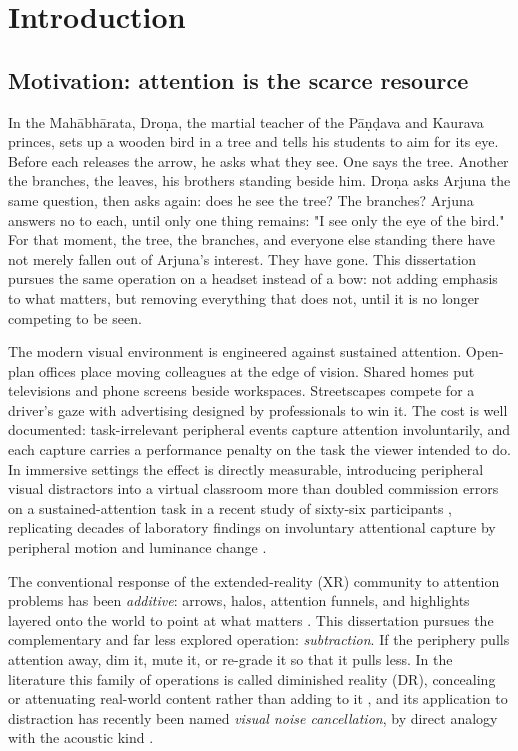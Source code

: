 \chapter{Introduction}

\section{Motivation: attention is the scarce resource}
In the Mah\=abh\=arata, Dro\d{n}a, the martial teacher of the P\=a\d{n}\d{d}ava and Kaurava princes, sets up a wooden 
bird in a tree and tells his students to aim for its eye. Before each releases the arrow, he asks what 
they see. One says the tree. Another the branches, the leaves, his brothers standing beside him. 
Dro\d{n}a asks Arjuna the same question, then asks again: does he see the tree? The branches? Arjuna answers
no to each, until only one thing remains: "I see only the eye of the bird." For that moment, the tree,
the branches, and everyone else standing there have not merely fallen out of Arjuna's interest. They have gone.
This dissertation pursues the same operation on a headset instead of a bow: not adding emphasis to what matters,
 but removing everything that does not, until it is no longer competing to be seen.

The modern visual environment is engineered against sustained attention. Open-plan offices place
moving colleagues at the edge of vision. Shared homes put televisions and phone screens beside
workspaces. Streetscapes compete for a driver's gaze with advertising designed by professionals to
win it. The cost is well documented: task-irrelevant peripheral events capture attention
involuntarily, and each capture carries a performance penalty on the task the viewer intended to do.
In immersive settings the effect is directly measurable, introducing peripheral visual distractors
into a virtual classroom more than doubled commission errors on a sustained-attention task in a
recent study of sixty-six participants \citep{ai2025}, replicating decades
of laboratory findings on involuntary attentional capture by peripheral motion and luminance change
\citep{itti1998}.

The conventional response of the extended-reality (XR) community to attention problems has been
\textit{additive}: arrows, halos, attention funnels, and highlights layered onto the world to point at what
matters \citep{biocca2006}. This dissertation pursues the complementary and far less explored
operation: \textit{subtraction}. If the periphery pulls attention away, dim it, mute it, or re-grade it so
that it pulls less. In the literature this family of operations is called diminished reality (DR), 
concealing or attenuating real-world content rather than adding to it \citep{mori2017,cheng2022},  and its application to distraction has recently been named \textit{visual noise
cancellation}, by direct analogy with the acoustic kind \citep{hong2024}.

